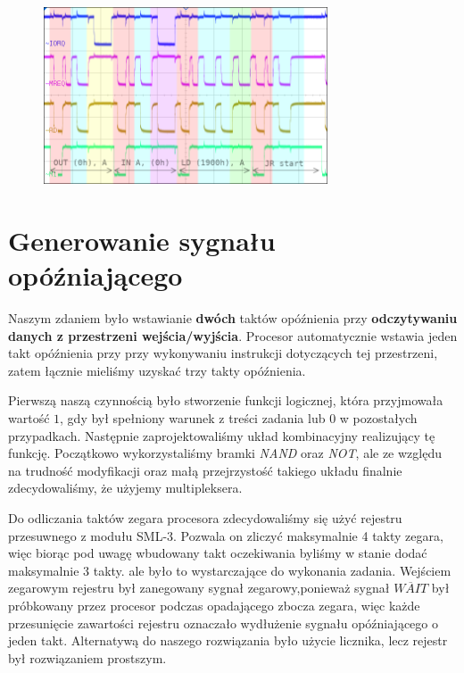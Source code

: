 \documentclass[fleqn]{article}
\begin{document}
\begin{figure}[H]
	\centering
	\includegraphics[width=0.75\textwidth]{img/1a.png}
	\caption{}
\end{figure}

\section{Generowanie sygnału opóźniającego}

Naszym zdaniem było wstawianie \textbf{dwóch} taktów opóźnienia przy \textbf{odczytywaniu danych z przestrzeni wejścia/wyjścia}. Procesor automatycznie wstawia jeden takt opóźnienia przy przy wykonywaniu instrukcji dotyczących tej przestrzeni, zatem łącznie mieliśmy uzyskać trzy takty opóźnienia.

Pierwszą naszą czynnością było stworzenie funkcji logicznej, która przyjmowała wartość $1$, gdy był spełniony warunek z treści zadania lub $0$ w pozostałych przypadkach. Następnie zaprojektowaliśmy układ kombinacyjny realizujący tę funkcję. Początkowo wykorzystaliśmy bramki \textit{NAND} oraz \textit{NOT}, ale ze względu na trudność modyfikacji oraz małą przejrzystość takiego układu finalnie zdecydowaliśmy, że użyjemy multipleksera.

Do odliczania taktów zegara procesora zdecydowaliśmy się użyć rejestru przesuwnego z modułu SML-3. Pozwala on zliczyć maksymalnie 4 takty zegara, więc biorąc pod uwagę wbudowany takt oczekiwania byliśmy w stanie dodać maksymalnie 3 takty. ale było to wystarczające do wykonania zadania. Wejściem zegarowym rejestru był zanegowany sygnał zegarowy,ponieważ sygnał $\overline{WAIT}$ był próbkowany przez procesor podczas opadającego zbocza zegara, więc każde przesunięcie zawartości rejestru oznaczało wydłużenie sygnału opóźniającego o jeden takt.  Alternatywą do naszego rozwiązania było użycie licznika, lecz rejestr był rozwiązaniem prostszym.
\end{document}
